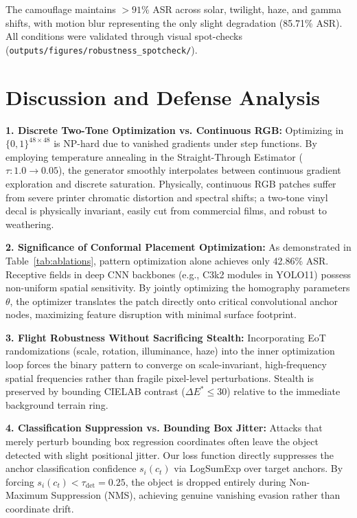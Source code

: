 \documentclass[conference]{IEEEtran}
\begin{document}
The camouflage maintains $>91\%$ ASR across solar, twilight, haze, and gamma shifts, with motion blur representing the only slight degradation (85.71\% ASR). All conditions were validated through visual spot-checks (\texttt{outputs/figures/robustness\_spotcheck/}).

\section{Discussion and Defense Analysis}
\textbf{1. Discrete Two-Tone Optimization vs. Continuous RGB:} Optimizing in $\{0, 1\}^{48 \times 48}$ is NP-hard due to vanished gradients under step functions. By employing temperature annealing in the Straight-Through Estimator ($\tau: 1.0 \rightarrow 0.05$), the generator smoothly interpolates between continuous gradient exploration and discrete saturation. Physically, continuous RGB patches suffer from severe printer chromatic distortion and spectral shifts; a two-tone vinyl decal is physically invariant, easily cut from commercial films, and robust to weathering.

\textbf{2. Significance of Conformal Placement Optimization:} As demonstrated in Table~\ref{tab:ablations}, pattern optimization alone achieves only 42.86\% ASR. Receptive fields in deep CNN backbones (e.g., C3k2 modules in YOLO11) possess non-uniform spatial sensitivity. By jointly optimizing the homography parameters $\theta$, the optimizer translates the patch directly onto critical convolutional anchor nodes, maximizing feature disruption with minimal surface footprint.

\textbf{3. Flight Robustness Without Sacrificing Stealth:} Incorporating EoT randomizations (scale, rotation, illuminance, haze) into the inner optimization loop forces the binary pattern to converge on scale-invariant, high-frequency spatial frequencies rather than fragile pixel-level perturbations. Stealth is preserved by bounding CIELAB contrast ($\Delta E^* \le 30$) relative to the immediate background terrain ring.

\textbf{4. Classification Suppression vs. Bounding Box Jitter:} Attacks that merely perturb bounding box regression coordinates often leave the object detected with slight positional jitter. Our loss function directly suppresses the anchor classification confidence $s_i(c_t)$ via LogSumExp over target anchors. By forcing $s_i(c_t) < \tau_{\text{det}} = 0.25$, the object is dropped entirely during Non-Maximum Suppression (NMS), achieving genuine vanishing evasion rather than coordinate drift.
\end{document}
